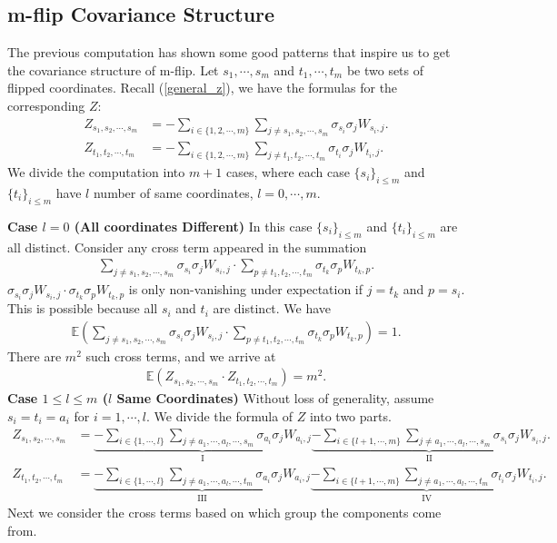 \documentclass[10pt]{article}
\newcommand{\e}{\mathbb{E}}
\newenvironment{Proof of lemma}{\noindent{\bf Proof of Lemma}}{\hfill$\Box$\newline}
\newenvironment{Proof of claim}{\noindent{\bf Proof of claim}}{\hfill$\Box$\newline}
\newenvironment{Proof of theorem}{\noindent{\bf Proof of Theorem}}{\hfill\scriptsize{$\Box$}\newline}
\newenvironment{Proof of theorems}{\noindent{\bf Proof of Theorems}}{\hfill$\Box$\newline}
\newenvironment{Proof of proposition}{\noindent{\bf Proof of Proposition}}{\hfill$\Box$\newline}
\newenvironment{Proof of propositions}{\noindent{\bf Proof of Propositions}}{\hfill$\Box$\newline}
\newenvironment{Proof of exercise}{\noindent{\it Proof of Exercise:}}{\hfill$\Box$}
\numberwithin{equation}{section}
\begin{document}
\subsection{m-flip Covariance Structure}
The previous computation has shown some good patterns that inspire us to get the covariance structure of m-flip. Let $s_1, \cdots, s_m$ and $t_1, \cdots, t_m$ be two sets of flipped coordinates. Recall (\ref{general_z}), we have the formulas for the corresponding $Z$:
\begin{align}
    Z_{s_1,s_2,\cdots,s_m} &= -\sum_{i \in \{1,2,\cdots,m\}} \sum_{j \neq s_1,s_2,\cdots,s_m} \sigma_{s_i} \sigma_j W_{s_i,j}. \\
    Z_{t_1,t_2,\cdots,t_m} &= -\sum_{i \in \{1,2,\cdots,m\}} \sum_{j \neq t_1,t_2,\cdots,t_m} \sigma_{t_i} \sigma_j W_{t_i,j}.
\end{align}
We divide the computation into $m+1$ cases, where each case $\{s_i\}_{i \leq m}$ and $\{t_i\}_{i \leq m}$ have $l$ number of same coordinates, $l = 0, \cdots, m$. 

\textbf{Case $l = 0$ (All coordinates Different)} In this case $\{s_i\}_{i \leq m}$ and $\{t_i\}_{i \leq m}$ are all distinct. Consider any cross term appeared in the summation
\begin{align}
    \sum_{j \neq s_1,s_2,\cdots,s_m} \sigma_{s_i} \sigma_j W_{s_i,j} \cdot \sum_{p \neq t_1,t_2,\cdots,t_m} \sigma_{t_k} \sigma_p W_{t_k,p}.
\end{align}
$\sigma_{s_i} \sigma_j W_{s_i,j} \cdot \sigma_{t_k} \sigma_p W_{t_k,p}$ is only non-vanishing under expectation if $j = t_k$ and $p = s_i$. This is possible because all $s_i$ and $t_i$ are distinct. We have
\begin{align}
    \e \left(\sum_{j \neq s_1,s_2,\cdots,s_m} \sigma_{s_i} \sigma_j W_{s_i,j} \cdot \sum_{p \neq t_1,t_2,\cdots,t_m} \sigma_{t_k} \sigma_p W_{t_k,p}\right) = 1.
\end{align}
There are $m^2$ such cross terms, and we arrive at
\begin{align}
    \e(Z_{s_1,s_2,\cdots,s_m} \cdot Z_{t_1,t_2,\cdots,t_m}) = m^2.
\end{align}
\textbf{Case $1\leq l \leq m$ ($l$ Same Coordinates)} Without loss of generality, assume $s_i=t_i=a_i$ for $i = 1, \cdots, l$. We divide the formula of $Z$ into two parts.
\begin{align}
        Z_{s_1,s_2,\cdots,s_m} &= \underbrace{-\sum_{i \in \{1,\cdots,l\}} \sum_{j \neq a_1,\cdots,a_l,\cdots,s_m} \sigma_{a_i} \sigma_j W_{a_i,j}}_\text{I} \underbrace{-\sum_{i \in \{l+1,\cdots,m\}} \sum_{j \neq a_1,\cdots,a_l,\cdots,s_m} \sigma_{s_i} \sigma_j W_{s_i,j}}_\text{II}. \\
        Z_{t_1,t_2,\cdots,t_m} &= \underbrace{-\sum_{i \in \{1,\cdots,l\}} \sum_{j \neq a_1,\cdots,a_l,\cdots,t_m} \sigma_{a_i} \sigma_j W_{a_i,j}}_\text{III} \underbrace{-\sum_{i \in \{l+1,\cdots,m\}} \sum_{j \neq a_1,\cdots,a_l,\cdots,t_m} \sigma_{t_i} \sigma_j W_{t_i,j}}_\text{IV}.
\end{align}
Next we consider the cross terms based on which group the components come from.
\end{document}
